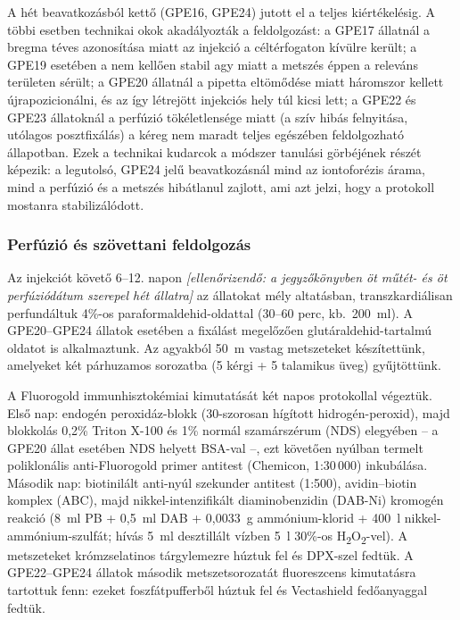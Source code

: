A hét beavatkozásból kettő (GPE16, GPE24) jutott el a teljes kiértékelésig.
A többi esetben technikai okok akadályozták a feldolgozást: a GPE17 állatnál
a bregma téves azonosítása miatt az injekció a céltérfogaton kívülre került;
a GPE19 esetében a nem kellően stabil agy miatt a metszés éppen a releváns
területen sérült; a GPE20 állatnál a pipetta eltömődése miatt háromszor
kellett újrapozicionálni, és az így létrejött injekciós hely túl kicsi lett;
a GPE22 és GPE23 állatoknál a perfúzió tökéletlensége miatt (a szív hibás
felnyitása, utólagos posztfixálás) a kéreg nem maradt teljes egészében
feldolgozható állapotban. Ezek a technikai kudarcok a módszer tanulási
görbéjének részét képezik: a legutolsó, GPE24 jelű beavatkozásnál mind az
iontoforézis árama, mind a perfúzió és a metszés hibátlanul zajlott, ami azt
jelzi, hogy a protokoll mostanra stabilizálódott.

\subsubsection{Perfúzió és szövettani feldolgozás}

Az injekciót követő 6--12. napon \emph{[ellenőrizendő: a jegyzőkönyvben öt műtét- és öt perfúziódátum szerepel hét állatra]} az állatokat mély altatásban,
transzkardiálisan perfundáltuk 4\%-os paraformaldehid-oldattal
(30--60 perc, kb.\ 200~ml). A GPE20--GPE24 állatok esetében a fixálást
megelőzően glutáraldehid-tartalmú oldatot is alkalmaztunk. Az agyakból
50~\textmu m vastag metszeteket készítettünk, amelyeket két párhuzamos
sorozatba (5 kérgi + 5 talamikus üveg) gyűjtöttünk.

A Fluorogold immunhisztokémiai kimutatását két napos protokollal végeztük.
Első nap: endogén peroxidáz-blokk (30-szorosan hígított hidrogén-peroxid),
majd blokkolás 0,2\% Triton X-100 és 1\% normál szamárszérum (NDS)
elegyében -- a GPE20 állat esetében NDS helyett BSA-val --, ezt követően
nyúlban termelt poliklonális anti-Fluorogold primer antitest
(Chemicon, 1:30\,000) inkubálása. Második nap: biotinilált anti-nyúl
szekunder antitest (1:500), avidin--biotin komplex (ABC), majd
nikkel-intenzifikált diaminobenzidin (DAB-Ni) kromogén reakció
(8~ml PB + 0,5~ml DAB + 0,0033~g ammónium-klorid + 400~\textmu l
nikkel-ammónium-szulfát; hívás 5~ml desztillált vízben 5~\textmu l 30\%-os
H\textsubscript{2}O\textsubscript{2}-vel). A metszeteket
krómzselatinos tárgylemezre húztuk fel és DPX-szel fedtük.
A GPE22--GPE24 állatok második metszetsorozatát fluoreszcens kimutatásra
tartottuk fenn: ezeket foszfátpufferből húztuk fel és Vectashield
fedőanyaggal fedtük.

